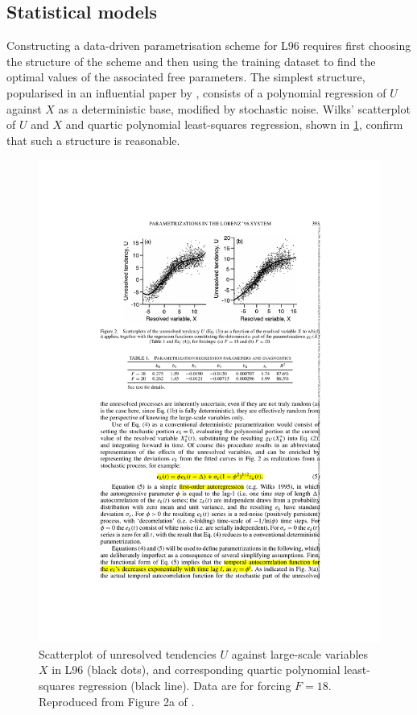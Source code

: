 \documentclass[titlepage,twoside]{article}
\numberwithin{equation}{section}
\begin{document}
\subsection{Statistical models} \label{sec:l96_statmodels}
Constructing a data-driven parametrisation scheme for L96 requires first
choosing the structure of the scheme and then using the training dataset to
find the optimal values of the associated free parameters. The simplest
structure, popularised in an influential paper by \textcite{wilks2005},
consists of a polynomial regression of $U$ against $X$ as a deterministic base,
modified by stochastic noise. Wilks' scatterplot of $U$ and $X$ and quartic
polynomial least-squares regression, shown in \cref{fig:wilks2005_regression},
confirm that such a structure is reasonable.

\begin{figure}[ht]
    \centering
    \includegraphics[width=0.3\linewidth]{figures/wilks2005_regression.pdf}
    \caption{
        Scatterplot of unresolved tendencies $U$ against large-scale variables
        $X$ in L96 (black dots), and corresponding quartic polynomial
        least-squares regression (black line). Data are for forcing $F=18$.
        Reproduced from Figure 2a of \textcite{wilks2005}.
    }
    \label{fig:wilks2005_regression}
\end{figure}
\end{document}
